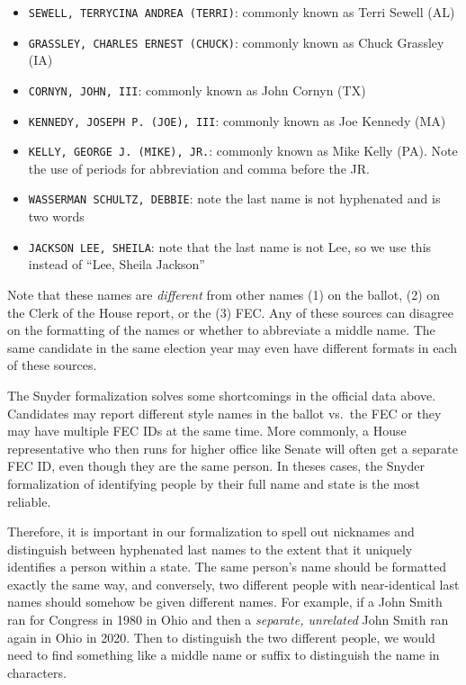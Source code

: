 \documentclass[12pt]{article}
\begin{document}
\begin{itemize}
\tightlist
\item
  \texttt{SEWELL,\ TERRYCINA\ ANDREA\ (TERRI)}: commonly known as Terri
  Sewell (AL)
\item
  \texttt{GRASSLEY,\ CHARLES\ ERNEST\ (CHUCK)}: commonly known as Chuck
  Grassley (IA)
\item
  \texttt{CORNYN,\ JOHN,\ III}: commonly known as John Cornyn (TX)
\item
  \texttt{KENNEDY,\ JOSEPH\ P.\ (JOE),\ III}: commonly known as Joe
  Kennedy (MA)
\item
  \texttt{KELLY,\ GEORGE\ J.\ (MIKE),\ JR.}: commonly known as Mike
  Kelly (PA). Note the use of periods for abbreviation and comma before
  the JR.
\item
  \texttt{WASSERMAN\ SCHULTZ,\ DEBBIE}: note the last name is not
  hyphenated and is two words
\item
  \texttt{JACKSON\ LEE,\ SHEILA}: note that the last name is not Lee, so
  we use this instead of ``Lee, Sheila Jackson''
\end{itemize}

Note that these names are \emph{different} from other names (1)
on the ballot, (2) on the Clerk of the House report, or the (3) FEC. Any
of these sources can disagree on the formatting of the names or whether
to abbreviate a middle name. The same candidate in the same election year may 
even have different formats in each of these sources.

The Snyder formalization solves some shortcomings in the official data
above. Candidates may report different style names in the ballot vs.~the
FEC or they may have multiple FEC IDs at the same time. More commonly, a
House representative who then runs for higher office like Senate will
often get a separate FEC ID, even though they are the same person. In
theses cases, the Snyder formalization of identifying people by their full
name and state is the most reliable.

Therefore, it is important in our formalization to spell out nicknames
and distinguish between hyphenated last names to the extent that it
uniquely identifies a person within a state. The same person's name
should be formatted exactly the same way, and conversely, two different
people with near-identical last names should somehow be given
{different} names. For example, if a John Smith ran for Congress
in 1980 in Ohio and then a \emph{separate, unrelated} John Smith ran
again in Ohio in 2020. Then to distinguish the two different people, we
would need to find {something} like a middle name or suffix to
distinguish the name in characters.
\end{document}
